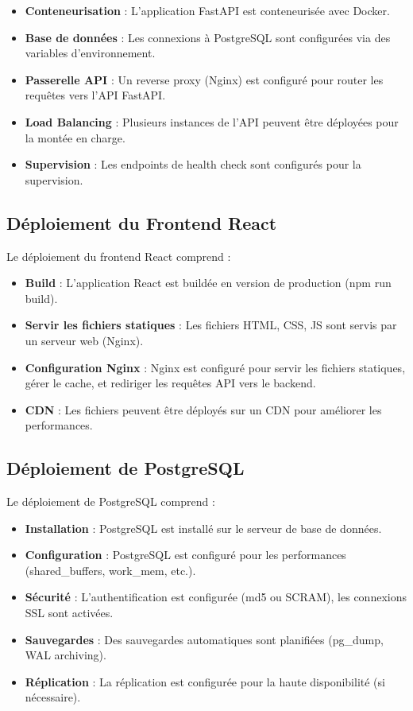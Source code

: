 \begin{itemize}
    \item \textbf{Conteneurisation} : L'application FastAPI est conteneurisée avec Docker.
    \item \textbf{Base de données} : Les connexions à PostgreSQL sont configurées via des variables d'environnement.
    \item \textbf{Passerelle API} : Un reverse proxy (Nginx) est configuré pour router les requêtes vers l'API FastAPI.
    \item \textbf{Load Balancing} : Plusieurs instances de l'API peuvent être déployées pour la montée en charge.
    \item \textbf{Supervision} : Les endpoints de health check sont configurés pour la supervision.
\end{itemize}

\subsection{Déploiement du Frontend React}
\label{subsec:deploiement-frontend}

Le déploiement du frontend React comprend :

\begin{itemize}
    \item \textbf{Build} : L'application React est buildée en version de production (npm run build).
    \item \textbf{Servir les fichiers statiques} : Les fichiers HTML, CSS, JS sont servis par un serveur web (Nginx).
    \item \textbf{Configuration Nginx} : Nginx est configuré pour servir les fichiers statiques, gérer le cache, et rediriger les requêtes API vers le backend.
    \item \textbf{CDN} : Les fichiers peuvent être déployés sur un CDN pour améliorer les performances.
\end{itemize}

\subsection{Déploiement de PostgreSQL}
\label{subsec:deploiement-database}

Le déploiement de PostgreSQL comprend :

\begin{itemize}
    \item \textbf{Installation} : PostgreSQL est installé sur le serveur de base de données.
    \item \textbf{Configuration} : PostgreSQL est configuré pour les performances (shared\_buffers, work\_mem, etc.).
    \item \textbf{Sécurité} : L'authentification est configurée (md5 ou SCRAM), les connexions SSL sont activées.
    \item \textbf{Sauvegardes} : Des sauvegardes automatiques sont planifiées (pg\_dump, WAL archiving).
    \item \textbf{Réplication} : La réplication est configurée pour la haute disponibilité (si nécessaire).
\end{itemize}


